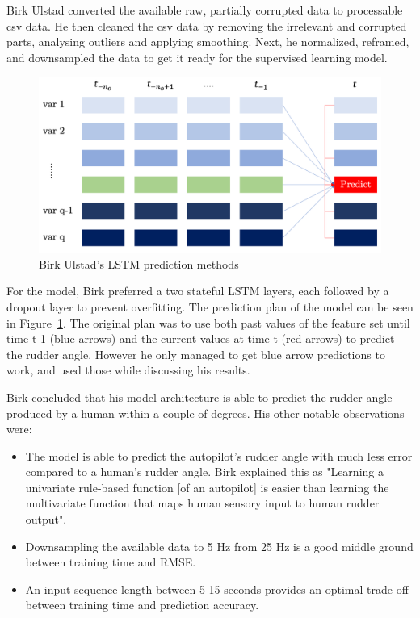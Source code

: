 \documentclass[12pt,twoside]{report}
\begin{document}
Birk Ulstad converted the available raw, partially corrupted data to processable csv data. He then cleaned the csv data by removing the irrelevant and corrupted parts, analysing outliers and applying smoothing. Next, he normalized, reframed, and downsampled the data to get it ready for the supervised learning model.

\begin{figure}[h]
\centering
\includegraphics[width = 0.75\hsize]{figures/Birk Ulstad LSTM prediction.png}
\caption{Birk Ulstad's LSTM prediction methods \cite{birk}}
\label{fig:birk lstm}
\end{figure}

For the model, Birk preferred a two stateful LSTM layers, each followed by a dropout layer to prevent overfitting. The prediction plan of the model can be seen in Figure~\ref{fig:birk lstm}. The original plan was to use both past values of the feature set until time t-1 (blue arrows) and the current values at time t (red arrows) to predict the rudder angle. However he only managed to get blue arrow predictions to work, and used those while discussing his results.

Birk concluded that his model architecture is able to predict the rudder angle produced by a human within a couple of degrees. His other notable observations were: 
\begin{itemize}
  \item The model is able to predict the autopilot's rudder angle with much less error compared to a human's rudder angle. Birk explained this as "Learning a univariate rule-based function [of an autopilot] is easier than learning the multivariate function that maps human sensory input to human rudder output".
  \item Downsampling the available data to 5 Hz from 25 Hz is a good middle ground between training time and RMSE. 
  \item An input sequence length between 5-15 seconds provides an optimal trade-off between training time and prediction accuracy.
\end{itemize} 
\end{document}
